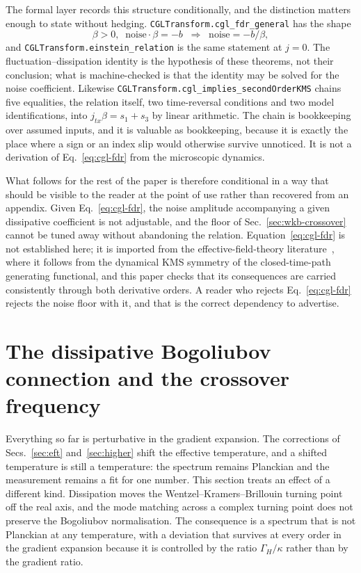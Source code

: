 \documentclass[aps,prd,reprint,nofootinbib,superscriptaddress]{revtex4-2}
\begin{document}
The formal layer records this structure conditionally, and the
distinction matters enough to state without hedging.
\texttt{CGLTransform.cgl\_fdr\_general} has the shape
\begin{equation*}
\beta > 0 ,\;\; \mathrm{noise}\cdot\beta = -b
  \;\;\Longrightarrow\;\; \mathrm{noise} = -b/\beta ,
\end{equation*}
and \texttt{CGLTransform.einstein\_relation} is the same statement at
$j = 0$. The fluctuation--dissipation identity is the hypothesis of
these theorems, not their conclusion; what is machine-checked is that
the identity may be solved for the noise coefficient. Likewise
\texttt{CGLTransform.cgl\_implies\_secondOrderKMS} chains five
equalities, the relation itself, two time-reversal conditions and two
model identifications, into $j_{tx}\beta = s_1 + s_3$ by linear
arithmetic. The chain is bookkeeping over assumed inputs, and it is
valuable as bookkeeping, because it is exactly the place where a sign
or an index slip would otherwise survive unnoticed. It is not a
derivation of Eq.~\eqref{eq:cgl-fdr} from the microscopic dynamics.

What follows for the rest of the paper is therefore conditional in a way
that should be visible to the reader at the point of use rather than
recovered from an appendix. Given Eq.~\eqref{eq:cgl-fdr}, the noise
amplitude accompanying a given dissipative coefficient is not adjustable,
and the floor of Sec.~\ref{sec:wkb-crossover} cannot be tuned away
without abandoning the relation. Equation~\eqref{eq:cgl-fdr} is not
established here; it is imported from the effective-field-theory
literature~\cite{CGL2017a,Crossley2017II,GloriosoLiu2018}, where it
follows from the dynamical KMS symmetry of the closed-time-path
generating functional, and this paper checks that its consequences are
carried consistently through both derivative orders. A reader who
rejects Eq.~\eqref{eq:cgl-fdr} rejects the noise floor with it, and
that is the correct dependency to advertise.

\section{The dissipative Bogoliubov connection and the crossover frequency}
\label{sec:wkb}

Everything so far is perturbative in the gradient expansion. The
corrections of Secs.~\ref{sec:eft} and~\ref{sec:higher} shift the
effective temperature, and a shifted temperature is still a temperature:
the spectrum remains Planckian and the measurement remains a fit for one
number. This section treats an effect of a different kind. Dissipation
moves the Wentzel--Kramers--Brillouin turning point off the real axis,
and the mode matching across a complex turning point does not preserve
the Bogoliubov normalisation. The consequence is a spectrum that is not
Planckian at any temperature, with a deviation that survives at every
order in the gradient expansion because it is controlled by the ratio
$\Gamma_H/\kappa$ rather than by the gradient ratio.
\end{document}
